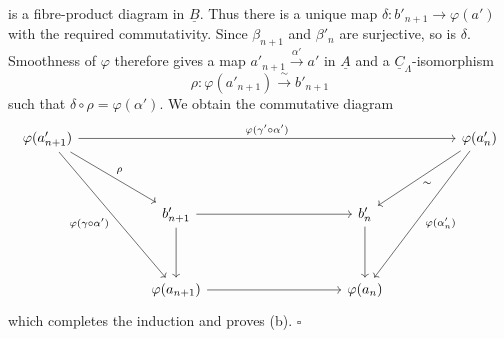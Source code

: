 is a fibre-product diagram in $\underline B$. Thus there is a unique
map $\delta:b'_{n+1}\longrightarrow\varphi(a')$ with the required
commutativity. Since $\beta_{n+1}$ and $\beta'_n$ are surjective, so
is $\delta$. Smoothness of $\varphi$ therefore gives a map
$a'_{n+1}\xrightarrow{\alpha'}a'$ in $\underline A$ and a
$\underline C_\Lambda$-isomorphism
\[
 \rho:\varphi(a'_{n+1})\xrightarrow{\ \sim\ }b'_{n+1}
\]
such that $\delta\circ\rho=\varphi(\alpha')$. We obtain the
commutative diagram
\[
\begin{tikzcd}[row sep=huge,column sep=huge]
 \varphi(a'_{n+1})
   \arrow[rrrr,"{\varphi(\gamma'\circ\alpha')}"]
   \arrow[dr,"{\rho}"]
   \arrow[ddr,"{\varphi(\gamma\circ\alpha')}"']
 &&&& \varphi(a'_n)
   \arrow[dl,"{\sim}"]
   \arrow[ddl,"{\varphi(\alpha'_n)}"]\\
 & b'_{n+1} \arrow[rr] \arrow[d]
 && b'_n \arrow[d] &\\
 & \varphi(a_{n+1}) \arrow[rr]
 && \varphi(a_n) &
\end{tikzcd}
\]
which completes the induction and proves (b). \hfill$\square$

